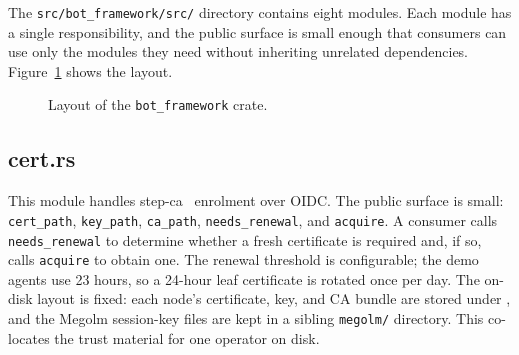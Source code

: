 \documentclass[11pt,a4paper]{article}
\begin{document}
The \texttt{src/bot\_framework/src/} directory contains eight
modules. Each module has a single responsibility, and the public
surface is small enough that consumers can use only the modules
they need without inheriting unrelated dependencies.
Figure~\ref{fig:framework-tree} shows the layout.

\begin{figure}[H]
\centering
{}
\caption{Layout of the \texttt{bot\_framework} crate.}
\label{fig:framework-tree}
\end{figure}

\subsection{cert.rs}

This module handles step-ca~\citep{stepca} enrolment over OIDC.
The public surface is small: \texttt{cert\_path},
\texttt{key\_path}, \texttt{ca\_path}, \texttt{needs\_renewal},
and \texttt{acquire}. A consumer calls \texttt{needs\_renewal} to
determine whether a fresh certificate is required and, if so,
calls \texttt{acquire} to obtain one. The renewal threshold is
configurable; the demo agents use 23 hours, so a 24-hour leaf
certificate is rotated once per day. The on-disk layout is fixed:
each node's certificate, key, and CA bundle are stored under
, and the Megolm session-key files
are kept in a sibling \texttt{megolm/} directory. This co-locates
the trust material for one operator on disk.
\end{document}
